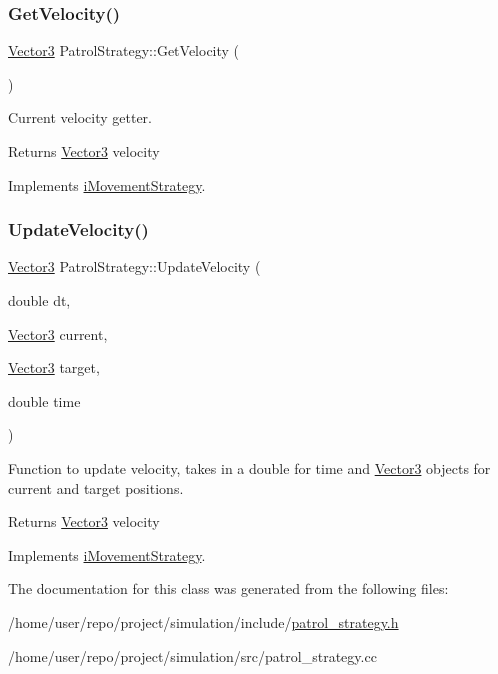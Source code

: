 \subsubsection{\texorpdfstring{Get\+Velocity()}{GetVelocity()}}
{\footnotesize\ttfamily \hyperlink{classVector3}{Vector3} Patrol\+Strategy\+::\+Get\+Velocity (\begin{DoxyParamCaption}{ }\end{DoxyParamCaption})\hspace{0.3cm}{\ttfamily [virtual]}}



Current velocity getter. 

\begin{DoxyReturn}{Returns}
\hyperlink{classVector3}{Vector3} velocity 
\end{DoxyReturn}


Implements \hyperlink{classiMovementStrategy_a92f20c8ebf7c4f7dde5743528b8e45b7}{i\+Movement\+Strategy}.

\mbox{\label{classPatrolStrategy_ae73db6cc70f328fed21f9df276a64587}} 
\subsubsection{\texorpdfstring{Update\+Velocity()}{UpdateVelocity()}}
{\footnotesize\ttfamily \hyperlink{classVector3}{Vector3} Patrol\+Strategy\+::\+Update\+Velocity (\begin{DoxyParamCaption}\item[{double}]{dt,  }\item[{\hyperlink{classVector3}{Vector3}}]{current,  }\item[{\hyperlink{classVector3}{Vector3}}]{target,  }\item[{double}]{time }\end{DoxyParamCaption})\hspace{0.3cm}{\ttfamily [virtual]}}



Function to update velocity, takes in a double for time and \hyperlink{classVector3}{Vector3} objects for current and target positions. 

\begin{DoxyReturn}{Returns}
\hyperlink{classVector3}{Vector3} velocity 
\end{DoxyReturn}


Implements \hyperlink{classiMovementStrategy_a40ec6c329ca0842638af80cfd509b372}{i\+Movement\+Strategy}.



The documentation for this class was generated from the following files\+:\begin{DoxyCompactItemize}
\item 
/home/user/repo/project/simulation/include/\hyperlink{patrol__strategy_8h}{patrol\+\_\+strategy.\+h}\item 
/home/user/repo/project/simulation/src/patrol\+\_\+strategy.\+cc\end{DoxyCompactItemize}
